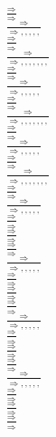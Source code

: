 \documentclass[11pt]{article}
\begin{document}
\begin{center}
\bigskip
\\$\frac{\Rightarrow }{\Rightarrow }$
\bigskip
\\$\frac{\Rightarrow }{\Rightarrow , , , , , }$
\bigskip
\\$\frac{\Rightarrow }{\Rightarrow }$
\bigskip
\\$\frac{\Rightarrow }{\Rightarrow , , , , , , , }$
\bigskip
\\$\frac{\Rightarrow }{\Rightarrow }$
\bigskip
\\$\frac{\Rightarrow }{\Rightarrow , , , , , }$
\bigskip
\\$\frac{\Rightarrow }{\Rightarrow }$
\bigskip
\\$\frac{\Rightarrow }{\Rightarrow , , , , , , , }$
\bigskip
\\$\frac{\Rightarrow }{\Rightarrow }$
\bigskip
\\$\frac{\Rightarrow }{\Rightarrow , , , , , }$
\bigskip
\\$\frac{\Rightarrow }{\Rightarrow }$
\bigskip
\\$\frac{\Rightarrow }{\Rightarrow , , , , , , , }$
\bigskip
\\$\frac{\Rightarrow }{\Rightarrow }$
\bigskip
\\$\frac{\Rightarrow }{\Rightarrow , , , , , }$
\bigskip
\\$\frac{\Rightarrow }{\Rightarrow }$
\bigskip
\\$\frac{\Rightarrow }{\Rightarrow }$
\bigskip
\\$\frac{\Rightarrow }{\Rightarrow }$
\bigskip
\\$\frac{\Rightarrow }{\Rightarrow , , , , , }$
\bigskip
\\$\frac{\Rightarrow }{\Rightarrow }$
\bigskip
\\$\frac{\Rightarrow }{\Rightarrow }$
\bigskip
\\$\frac{\Rightarrow }{\Rightarrow }$
\bigskip
\\$\frac{\Rightarrow }{\Rightarrow , , , , , }$
\bigskip
\\$\frac{\Rightarrow }{\Rightarrow }$
\bigskip
\\$\frac{\Rightarrow }{\Rightarrow }$
\bigskip
\\$\frac{\Rightarrow }{\Rightarrow }$
\bigskip
\\$\frac{\Rightarrow }{\Rightarrow , , , , , }$
\bigskip
\\$\frac{\Rightarrow }{\Rightarrow }$
\bigskip
\\$\frac{\Rightarrow }{\Rightarrow }$
\bigskip
\\$\frac{\Rightarrow }{\Rightarrow }$

\end{center}
\end{document}
